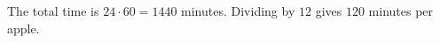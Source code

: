 The total time is $24\cdot60=1440$ minutes. Dividing by $12$ gives $\boxed{120}$ minutes per apple.
